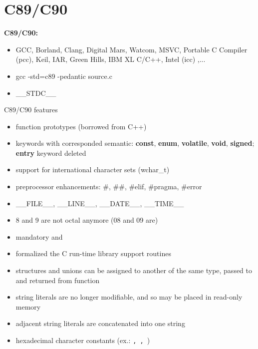 \section{C89/C90}
\begin{frame}{}
    \begin{block}{ \begin{Huge} \textbf{C89/C90:} \end{Huge}}
        \bigskip
        \bigskip
        \bigskip
        \begin{itemize} 
            \item GCC, Borland, Clang, Digital Mars, Watcom, MSVC, Portable C Compiler (pcc), Keil, IAR, Green Hills, IBM XL C/C++, Intel (icc) ,...
            \pause\item gcc -std=c89 -pedantic source.c
            \pause\item \_\_STDC\_\_
        \end{itemize}
        \bigskip
        \bigskip
        \bigskip
    \end{block}
\end{frame}
\begin{frame}{C89/C90 features}
    \begin{itemize}
        \item function prototypes (borrowed from C++)
        \pause\item keywords with corresponded semantic: \textbf{const}, \textbf{enum}, \textbf{volatile}, \textbf{void}, \textbf{signed}; \textbf{entry} keyword deleted
        \pause\item support for international character sets (wchar\_t)
        \pause\item preprocessor enhancements: \#, \#\#, \#elif, \#pragma, \#error
        \pause\item \_\_FILE\_\_, \_\_LINE\_\_, \_\_DATE\_\_, \_\_TIME\_\_
        \pause\item 8 and 9 are not octal anymore (08 and 09 are)
        \pause\item mandatory  and 
        \pause\item formalized the C run-time library support routines
        \pause\item structures and unions can be assigned to another of the same type, passed to and returned from function
        \pause\item string literals are no longer modifiable, and so may be placed in read-only memory
        \pause\item adjacent string literals are concatenated into one string
        \pause\item hexadecimal character constants (ex.: \texttt{, , })
    \end{itemize}
\end{frame}
